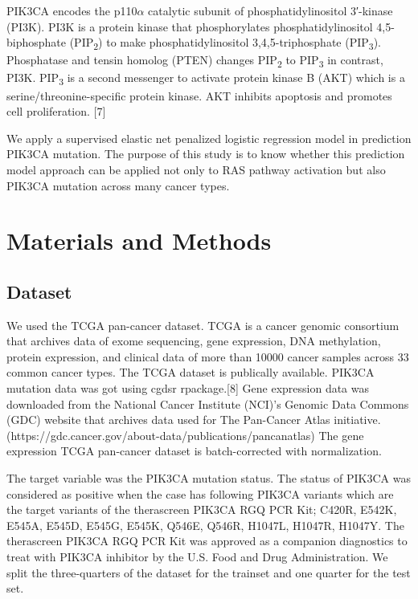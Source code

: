 \documentclass[10pt,letterpaper]{article}
\begin{document}
PIK3CA encodes the p110\(\alpha\) catalytic subunit of
phosphatidylinositol 3′-kinase (PI3K). PI3K is a protein kinase that
phosphorylates phosphatidylinositol 4,5-biphosphate
(PIP\textsubscript{2}) to make phosphatidylinositol 3,4,5-triphosphate
(PIP\textsubscript{3}). Phosphatase and tensin homolog (PTEN) changes
PIP\textsubscript{2} to PIP\textsubscript{3} in contrast, PI3K.
PIP\textsubscript{3} is a second messenger to activate protein kinase B
(AKT) which is a serine/threonine-specific protein kinase. AKT inhibits
apoptosis and promotes cell proliferation. {[}7{]}

We apply a supervised elastic net penalized logistic regression model in
prediction PIK3CA mutation. The purpose of this study is to know whether
this prediction model approach can be applied not only to RAS pathway
activation but also PIK3CA mutation across many cancer types.

\hypertarget{materials-and-methods}{%
\section{Materials and Methods}\label{materials-and-methods}}

\hypertarget{dataset}{%
\subsection{Dataset}\label{dataset}}

We used the TCGA pan-cancer dataset. TCGA is a cancer genomic consortium
that archives data of exome sequencing, gene expression, DNA
methylation, protein expression, and clinical data of more than 10000
cancer samples across 33 common cancer types. The TCGA dataset is
publically available. PIK3CA mutation data was got using cgdsr
rpackage.{[}8{]} Gene expression data was downloaded from the National
Cancer Institute (NCI)'s Genomic Data Commons (GDC) website that
archives data used for The Pan-Cancer Atlas initiative.
(https://gdc.cancer.gov/about-data/publications/pancanatlas) The gene
expression TCGA pan-cancer dataset is batch-corrected with
normalization.

The target variable was the PIK3CA mutation status. The status of PIK3CA
was considered as positive when the case has following PIK3CA variants
which are the target variants of the therascreen PIK3CA RGQ PCR Kit;
C420R, E542K, E545A, E545D, E545G, E545K, Q546E, Q546R, H1047L, H1047R,
H1047Y. The therascreen PIK3CA RGQ PCR Kit was approved as a companion
diagnostics to treat with PIK3CA inhibitor by the U.S. Food and Drug
Administration. We split the three-quarters of the dataset for the
trainset and one quarter for the test set.
\end{document}
